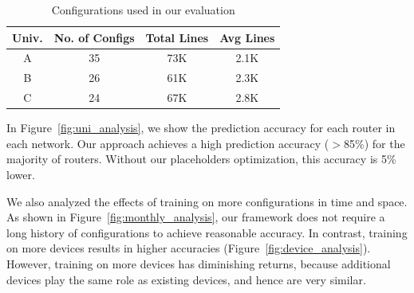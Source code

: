 \begin{table}
    \small \centering
    \begin{tabular}{ | c | c | c | c |}
    \hline
        {\bf Univ.} & {\bf No. of Configs} & {\bf Total Lines} & {\bf Avg
    Lines} \\ 
    \hline
    A & 35 & 73K & 2.1K \\ 
    B & 26 & 61K & 2.3K \\ 
    C & 24 & 67K & 2.8K \\ 
    \hline
    \end{tabular}
    \caption{Configurations used in our evaluation}
    \vspace{-2em}
    \label{tab:datasets}
\end{table}


In Figure~\ref{fig:uni_analysis}, we show the prediction accuracy for
each router in each network. Our approach achieves a high prediction accuracy
($>$85\%) for the majority of routers. Without our placeholders optimization,
this accuracy is 5\% lower.

We also analyzed the effects of training on more configurations in time and
space. As shown in Figure~\ref{fig:monthly_analysis}, our framework does not
require a long history of configurations to achieve reasonable accuracy. In
contrast, training on more devices results in higher accuracies
(Figure~\ref{fig:device_analysis}). However, training on more devices has
diminishing returns, because additional devices play the same role as
existing devices, and hence are very similar.


